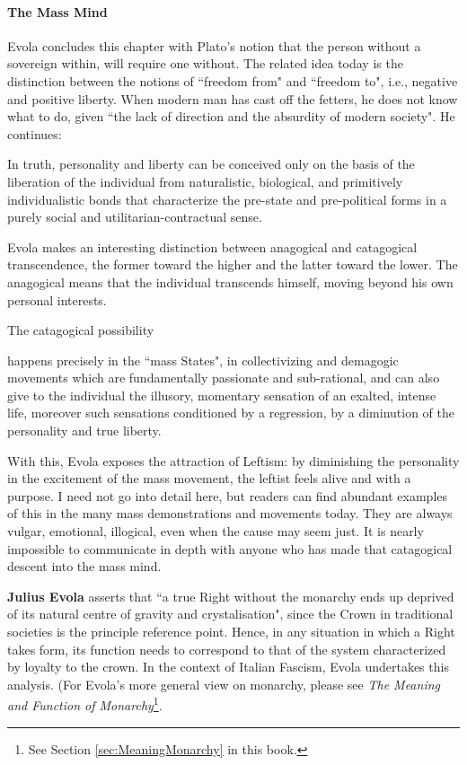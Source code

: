 \paragraph{The Mass Mind}
Evola concludes this chapter with Plato's notion that the person without a sovereign within, will require one without. The related idea today is the distinction between the notions of ``freedom from" and ``freedom to", i.e., negative and positive liberty. When modern man has cast off the fetters, he does not know what to do, given ``the lack of direction and the absurdity of modern society". He continues:

\begin{quotex}
In truth, personality and liberty can be conceived only on the basis of the liberation of the individual from naturalistic, biological, and primitively individualistic bonds that characterize the pre-state and pre-political forms in a purely social and utilitarian-contractual sense. 

\end{quotex}
Evola makes an interesting distinction between anagogical and catagogical transcendence, the former toward the higher and the latter toward the lower. The anagogical means that the individual transcends himself, moving beyond his own personal interests.

The catagogical possibility

\begin{quotex}
happens precisely in the ``mass States", in collectivizing and demagogic movements which are fundamentally passionate and sub-rational, and can also give to the individual the illusory, momentary sensation of an exalted, intense life, moreover such sensations conditioned by a regression, by a diminution of the personality and true liberty. 

\end{quotex}
With this, Evola exposes the attraction of Leftism: by diminishing the personality in the excitement of the mass movement, the leftist feels alive and with a purpose. I need not go into detail here, but readers can find abundant examples of this in the many mass demonstrations and movements today. They are always vulgar, emotional, illogical, even when the cause may seem just. It is nearly impossible to communicate in depth with anyone who has made that catagogical descent into the mass mind.

\textbf{Julius Evola} asserts that ``a true Right without the monarchy ends up deprived of its natural centre of gravity and crystalisation", since the Crown in traditional societies is the principle reference point. Hence, in any situation in which a Right takes form, its function needs to correspond to that of the system characterized by loyalty to the crown. In the context of Italian Fascism, Evola undertakes this analysis. (For Evola's more general view on monarchy, please see \textit{The Meaning and Function of Monarchy}\footnote{See Section \ref{sec:MeaningMonarchy} in this book.}.

